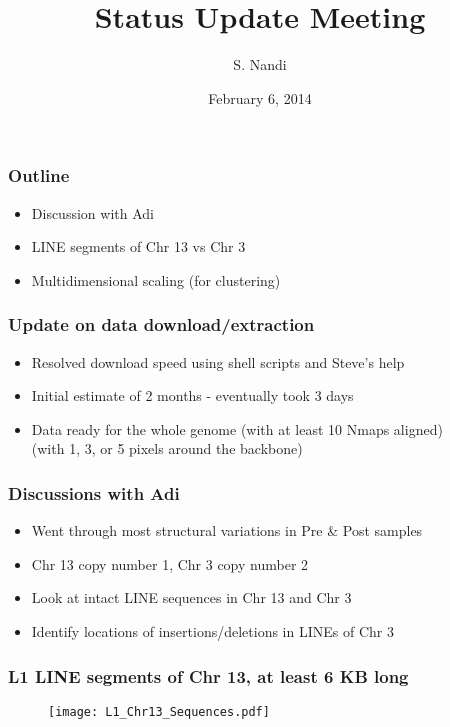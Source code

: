 \documentclass[10pt,dvipsnames,table]{beamer}
\title[Status Update Jan, 2015]{Status Update Meeting}
\author{S. Nandi}
\institute[LMCG]{LMCG \\
 University of Wisconsin-Madison}
\date{February 6, 2014}
\begin{document}
\setlength{\baselineskip}{16truept}
\frame{\maketitle}

\begin{frame}
\frametitle{Outline}
\begin{itemize}
\item Discussion with Adi
\item LINE segments of Chr 13 vs Chr 3
\item Multidimensional scaling (for clustering)
\end{itemize}
\end{frame}

\begin{frame}
\frametitle{Update on data download/extraction}
\begin{itemize}
\item Resolved download speed using shell scripts and Steve's help
\item Initial estimate of 2 months - eventually took 3 days
\item Data ready for the whole genome (with at least 10 Nmaps aligned) \\
  (with 1, 3, or 5 pixels around the backbone)
\end{itemize}
\end{frame}

\begin{frame}
\frametitle{Discussions with Adi}
\begin{itemize}
\pause \item Went through most structural variations in Pre \& Post samples
\pause \item Chr 13 copy number 1, Chr 3 copy number 2
\pause \item Look at intact LINE sequences in Chr 13 and Chr 3
\pause \item Identify locations of insertions/deletions in LINEs of Chr 3
\end{itemize}
\end{frame}

\begin{frame}
\frametitle{L1 LINE segments of Chr 13, at least 6 KB long}
\begin{figure}
\centering
\texttt{[image: L1\_Chr13\_Sequences.pdf]}
\end{figure}
\end{frame}
\end{document}
